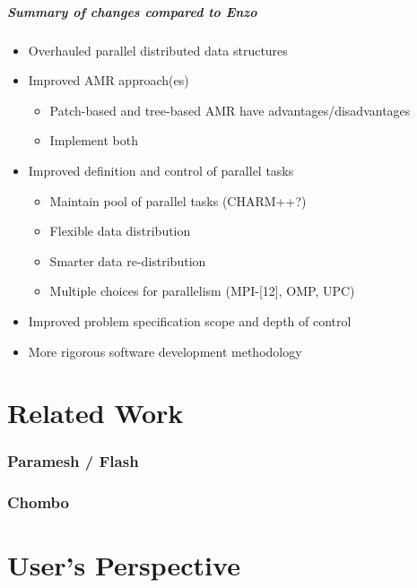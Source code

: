 \documentclass{beamer}
\newcommand{\enzo}{\textsf{Enzo}}
\begin{document}
\begin{frame}
\frametitle{Summary of changes compared to \enzo}
\begin{itemize}
\item Overhauled parallel distributed data structures
\item Improved AMR approach(es)
\begin{itemize}
\item  Patch-based and tree-based AMR have advantages/disadvantages
\item  Implement both
\end{itemize}
\item Improved definition and control of parallel tasks
\begin{itemize}
\item Maintain pool of parallel tasks (CHARM++?)
\item Flexible data distribution
\item Smarter  data re-distribution
\item Multiple choices for parallelism (MPI-[12], OMP, UPC)
\end{itemize}
\item Improved problem specification scope and depth of control
\item More rigorous software development methodology
\end{itemize}

\end{frame}

\part{Related Work}

\section{Paramesh / Flash}

\section{Chombo}

\part{User's Perspective}
\end{document}

